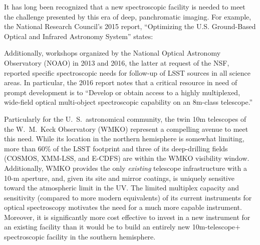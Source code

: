 \documentclass[11pt,a4paper,twoside,onecolumn,openany,final,oldfontcommands]{memoir}
\begin{document}
It has long been recognized that a new spectroscopic facility is needed to meet the challenge presented by this era of deep, panchromatic imaging. For example, the National Research Council's 2015 report, ``Optimizing the U.S. Ground-Based Optical and Infrared Astronomy System'' \citep{NAP21722} states:
%
\noindent{}
%
Additionally, workshops organized by the National Optical Astronomy Observatory (NOAO) in 2013 and 2016, the latter at request of the NSF, reported specific spectroscopic needs for follow-up of LSST sources in all science areas.  In particular, the 2016 report notes that a critical resource in need of prompt development is to ``Develop or obtain access to a highly multiplexed, wide-field optical multi-object spectroscopic capability on an 8m-class telescope.''

Particularly for the U.~S.\ astronomical community, the twin 10m telescopes of the W.~M.~Keck Observatory (WMKO) represent a compelling avenue to meet this need.  While its location in the northern hemisphere is somewhat limiting, more than 60\% of the LSST footprint and three of its deep-drilling fields (COSMOS, XMM-LSS, and E-CDFS) are within the WMKO visibility window.    Additionally, WMKO provides the only {\it existing} telescope infrastructure with a 10-m aperture, and, given its site and mirror coatings, is uniquely sensitive toward the atmospheric limit in the UV.  The limited multiplex capacity and sensitivity (compared to more modern equivalents) of its current instruments for optical spectroscopy motivates the need for a much more capable instrument.  Moreover, it is significantly more cost effective to invest in a new instrument for an existing facility than it would be to build an entirely new 10m-telescope$+$spectroscopic facility in the southern hemisphere.
\end{document}
